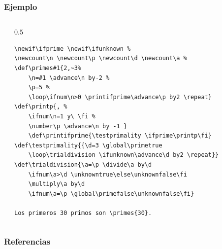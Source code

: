 \documentclass[12pt,aspectratio=169,ignorenonframetext]{ltxbeamer}
\begin{document}
\begin{frame}[fragile]
\frametitle{Ejemplo}

\begin{columns}
    \pause
    {\color{gray} \vline}
    \begin{column}{0.5\textwidth}
        \tiny
        \begin{verbatim}
\newif\ifprime \newif\ifunknown %
\newcount\n \newcount\p \newcount\d \newcount\a %
\def\primes#1{2,~3%
    \n=#1 \advance\n by-2 %
    \p=5 %
    \loop\ifnum\n>0 \printifprime\advance\p by2 \repeat}
\def\printp{, %
    \ifnum\n=1 y\ \fi %
    \number\p \advance\n by -1 }
    \def\printifprime{\testprimality \ifprime\printp\fi}
\def\testprimality{{\d=3 \global\primetrue
    \loop\trialdivision \ifunknown\advance\d by2 \repeat}}
\def\trialdivision{\a=\p \divide\a by\d
    \ifnum\a>\d \unknowntrue\else\unknownfalse\fi
    \multiply\a by\d
    \ifnum\a=\p \global\primefalse\unknownfalse\fi}

Los primeros 30 primos son \primes{30}.
        \end{verbatim}
    \end{column}
\end{columns}
\end{frame}





\begin{frame}[allowframebreaks]
\frametitle{Referencias}
\nocite{*}
\printbibliography
\end{frame}
\end{document}
